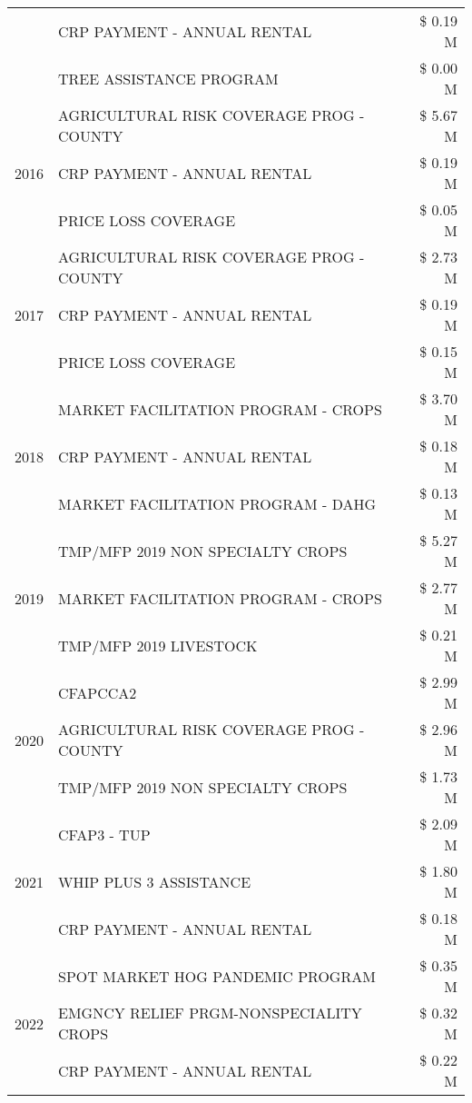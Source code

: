 \begin{tabular}{llr}
 & CRP PAYMENT - ANNUAL RENTAL & \$ 0.19 M \\
 & TREE ASSISTANCE PROGRAM & \$ 0.00 M \\
\cline{1-3}
\multirow[t]{3}{*}{2016} & AGRICULTURAL RISK COVERAGE PROG - COUNTY & \$ 5.67 M \\
 & CRP PAYMENT - ANNUAL RENTAL & \$ 0.19 M \\
 & PRICE LOSS COVERAGE & \$ 0.05 M \\
\cline{1-3}
\multirow[t]{3}{*}{2017} & AGRICULTURAL RISK COVERAGE PROG - COUNTY & \$ 2.73 M \\
 & CRP PAYMENT - ANNUAL RENTAL & \$ 0.19 M \\
 & PRICE LOSS COVERAGE & \$ 0.15 M \\
\cline{1-3}
\multirow[t]{3}{*}{2018} & MARKET FACILITATION PROGRAM - CROPS & \$ 3.70 M \\
 & CRP PAYMENT - ANNUAL RENTAL & \$ 0.18 M \\
 & MARKET FACILITATION PROGRAM - DAHG & \$ 0.13 M \\
\cline{1-3}
\multirow[t]{3}{*}{2019} & TMP/MFP 2019 NON SPECIALTY CROPS & \$ 5.27 M \\
 & MARKET FACILITATION PROGRAM - CROPS & \$ 2.77 M \\
 & TMP/MFP 2019 LIVESTOCK & \$ 0.21 M \\
\cline{1-3}
\multirow[t]{3}{*}{2020} & CFAPCCA2 & \$ 2.99 M \\
 & AGRICULTURAL RISK COVERAGE PROG - COUNTY & \$ 2.96 M \\
 & TMP/MFP 2019 NON SPECIALTY CROPS & \$ 1.73 M \\
\cline{1-3}
\multirow[t]{3}{*}{2021} & CFAP3 - TUP & \$ 2.09 M \\
 & WHIP PLUS 3 ASSISTANCE & \$ 1.80 M \\
 & CRP PAYMENT - ANNUAL RENTAL & \$ 0.18 M \\
\cline{1-3}
\multirow[t]{3}{*}{2022} & SPOT MARKET HOG PANDEMIC PROGRAM & \$ 0.35 M \\
 & EMGNCY RELIEF PRGM-NONSPECIALITY CROPS & \$ 0.32 M \\
 & CRP PAYMENT - ANNUAL RENTAL & \$ 0.22 M \\
\cline{1-3}
\bottomrule
\end{tabular}
